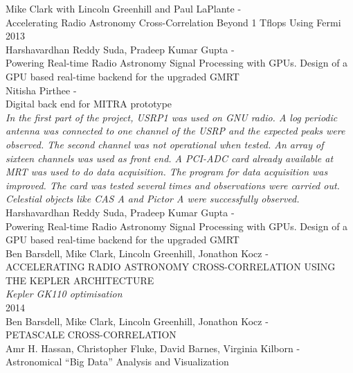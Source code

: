\noindent
{\large Mike Clark with Lincoln Greenhill and Paul LaPlante - \hfill \\ Accelerating Radio Astronomy Cross-Correlation Beyond 1 Tflops Using Fermi }\\


\noindent
{\large 2013}\\
\noindent
{\large Harshavardhan Reddy Suda, Pradeep Kumar Gupta - \hfill \\ Powering Real-time Radio Astronomy Signal Processing with GPUs. Design of a GPU based real-time backend for the upgraded GMRT  }\\

\noindent
{\large Nitisha Pirthee - \hfill \\ Digital back end for MITRA prototype}\\
\indent \textit{In the first part of the project, USRP1 was used on GNU radio. A log periodic antenna was connected to one channel of the USRP and the expected peaks were observed. The second channel was not operational when tested. An array of sixteen channels was used as front end. A PCI-ADC card already available at MRT was used to do data acquisition. The program for data acquisition was improved. The card was tested several times and observations were carried out. Celestial objects like CAS A and Pictor A were successfully observed.
}\\

\noindent
{\large Harshavardhan Reddy Suda, Pradeep Kumar Gupta - \hfill \\ Powering Real-time Radio Astronomy Signal Processing with GPUs. Design of a GPU based real-time backend for the upgraded GMRT  }\\

\noindent
{\large Ben Barsdell, Mike Clark, Lincoln Greenhill, Jonathon Kocz - \hfill \\ ACCELERATING RADIO ASTRONOMY CROSS-CORRELATION USING THE KEPLER ARCHITECTURE  }\\
\indent \textit{Kepler GK110 optimisation
}\\

\noindent
{\large 2014}\\
\noindent
{\large Ben Barsdell, Mike Clark, Lincoln Greenhill, Jonathon Kocz - \hfill \\ PETASCALE CROSS-CORRELATION }\\

\noindent
{\large Amr H. Hassan, Christopher Fluke, David Barnes, Virginia Kilborn - \hfill \\ Astronomical “Big Data” Analysis and Visualization }\\

